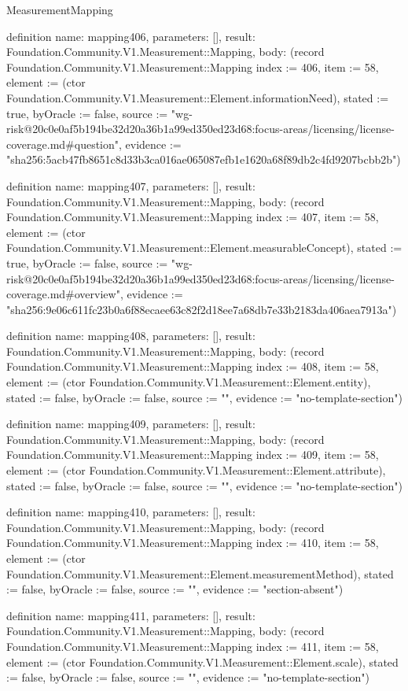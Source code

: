 \begin{lexlean}{MeasurementMapping}
\begin{semanticmodule}
definition{
  name: mapping406,
  parameters: [],
  result: Foundation.Community.V1.Measurement::Mapping,
  body: (record Foundation.Community.V1.Measurement::Mapping {index := 406, item := 58, element := (ctor Foundation.Community.V1.Measurement::Element.informationNeed), stated := true, byOracle := false, source := "wg-risk@20c0e0af5b194be32d20a36b1a99ed350ed23d68:focus-areas/licensing/license-coverage.md#question", evidence := "sha256:5acb47fb8651c8d33b3ca016ae065087efb1e1620a68f89db2c4fd9207bcbb2b"})
}

definition{
  name: mapping407,
  parameters: [],
  result: Foundation.Community.V1.Measurement::Mapping,
  body: (record Foundation.Community.V1.Measurement::Mapping {index := 407, item := 58, element := (ctor Foundation.Community.V1.Measurement::Element.measurableConcept), stated := true, byOracle := false, source := "wg-risk@20c0e0af5b194be32d20a36b1a99ed350ed23d68:focus-areas/licensing/license-coverage.md#overview", evidence := "sha256:9e06c611fc23b0a6f88ecaee63c82f2d18ee7a68db7e33b2183da406aea7913a"})
}

definition{
  name: mapping408,
  parameters: [],
  result: Foundation.Community.V1.Measurement::Mapping,
  body: (record Foundation.Community.V1.Measurement::Mapping {index := 408, item := 58, element := (ctor Foundation.Community.V1.Measurement::Element.entity), stated := false, byOracle := false, source := "", evidence := "no-template-section"})
}

definition{
  name: mapping409,
  parameters: [],
  result: Foundation.Community.V1.Measurement::Mapping,
  body: (record Foundation.Community.V1.Measurement::Mapping {index := 409, item := 58, element := (ctor Foundation.Community.V1.Measurement::Element.attribute), stated := false, byOracle := false, source := "", evidence := "no-template-section"})
}

definition{
  name: mapping410,
  parameters: [],
  result: Foundation.Community.V1.Measurement::Mapping,
  body: (record Foundation.Community.V1.Measurement::Mapping {index := 410, item := 58, element := (ctor Foundation.Community.V1.Measurement::Element.measurementMethod), stated := false, byOracle := false, source := "", evidence := "section-absent"})
}

definition{
  name: mapping411,
  parameters: [],
  result: Foundation.Community.V1.Measurement::Mapping,
  body: (record Foundation.Community.V1.Measurement::Mapping {index := 411, item := 58, element := (ctor Foundation.Community.V1.Measurement::Element.scale), stated := false, byOracle := false, source := "", evidence := "no-template-section"})
}


\end{semanticmodule}
\end{lexlean}
